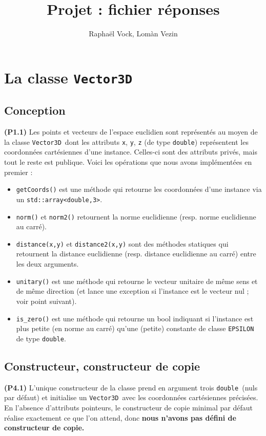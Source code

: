 \documentclass[12pt, letterpaper, twoside]{article}
\title{Projet : fichier réponses}
\author{Raphaël Vock, Lomàn Vezin}
\newcommand{\T}[1]{\texttt{#1}}
\newcommand{\V}[0]{\texttt{Vector3D}}
\newcommand{\double}{\texttt{double}}
\begin{document}
\maketitle
\section{La classe \T{Vector3D}}
\subsection{Conception}
\noindent \textbf{(P1.1)} Les points et vecteurs de l'espace euclidien sont représentés au moyen de la classe \V\ dont les attributs \T{x}, \T{y}, \T{z} (de type \double) représentent les coordonnées cartésiennes d'une instance. Celles-ci sont des attributs privés, mais tout le reste est publique. Voici les opérations que nous avons implémentées en premier :

\begin{itemize}

\item \T{getCoords()}  est une méthode qui retourne les coordonnées d'une instance via un \T{std::array<double,3>}.

\item \T{norm()} et \T{norm2()} retournent la norme euclidienne (resp. norme euclidienne au carré).

\item \T{distance(x,y)} et \T{distance2(x,y)} sont des méthodes statiques qui retournent la distance euclidienne (resp. distance euclidienne au carré) entre les deux arguments.

\item \T{unitary()} est une méthode qui retourne le vecteur unitaire de même sens et de même direction (et lance une exception si l'instance est le vecteur nul ; voir point suivant).

\item \T{is\_zero()} est une méthode qui retourne un bool indiquant si l'instance est plus petite (en norme au carré) qu'une (petite) constante de classe \T{EPSILON} de type \double.
\end{itemize}

\subsection{Constructeur, constructeur de copie}
\noindent \textbf{(P4.1)} L'unique constructeur de la classe prend en argument trois \double\ (nuls par défaut) et initialise un \V\ avec les coordonnées cartésiennes précisées. En l'absence d'attributs pointeurs, le constructeur de copie minimal par défaut réalise exactement ce que l'on attend, donc \textbf{nous n'avons pas défini de constructeur de copie.}
\end{document}
